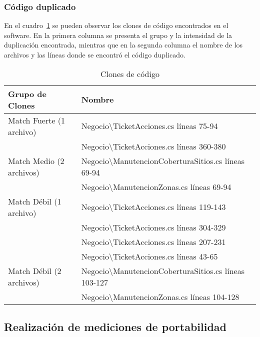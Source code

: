 \subsubsection{Código duplicado}

En el cuadro~\ref{table:clones} se pueden observar los clones de código 
encontrados en el software. En la primera columna se presenta el grupo y la 
intensidad de la duplicación encontrada, mientras que en la segunda columna el
nombre de los archivos y las líneas donde se encontró el código duplicado.

\begin{table}[hb]
    \small
\centering

  \begin{tabular}{ | l | l | }
  
  \hline
    \bf{Grupo de Clones} & \bf{Nombre} \\ \hline
    Match Fuerte (1 archivo) & Negocio\textbackslash TicketAcciones.cs líneas 75-94 \\ \hline
     & Negocio\textbackslash TicketAcciones.cs líneas 360-380 \\ \hline
    Match Medio (2 archivos) & Negocio\textbackslash ManutencionCoberturaSitios.cs líneas 69-94 \\ \hline
     & Negocio\textbackslash ManutencionZonas.cs líneas 69-94 \\ \hline
    Match Débil (1 archivo) & Negocio\textbackslash TicketAcciones.cs líneas 119-143 \\ \hline
     & Negocio\textbackslash TicketAcciones.cs líneas 304-329 \\ \hline
     & Negocio\textbackslash TicketAcciones.cs líneas 207-231 \\ \hline
     & Negocio\textbackslash TicketAcciones.cs líneas 43-65 \\ \hline
    Match Débil (2 archivos) & Negocio\textbackslash ManutencionCoberturaSitios.cs líneas 103-127 \\ \hline
     & Negocio\textbackslash ManutencionZonas.cs líneas 104-128 \\ \hline
  \end{tabular}
  \caption{Clones de código}
  \label{table:clones}
\end{table}




\subsection{Realización de mediciones de portabilidad}

